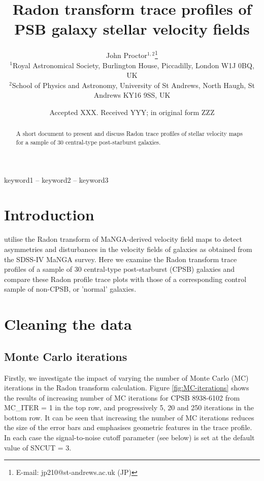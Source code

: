 \documentclass[fleqn,usenatbib]{mnras}
\title[Radon trace profiles of PSB galaxies]{Radon transform trace profiles of PSB galaxy stellar velocity fields}
\author[John Proctor]{
John Proctor$^{1,2}$\thanks{E-mail: jp210@st-andrews.ac.uk (JP)}
\\
$^{1}$Royal Astronomical Society, Burlington House, Piccadilly, London W1J 0BQ, UK\\
$^{2}$School of Physics and Astronomy, University of St Andrews, North Haugh, St Andrews KY16 9SS, UK\\
}
\date{Accepted XXX. Received YYY; in original form ZZZ}
\begin{document}
\label{firstpage}
\pagerange{\pageref{firstpage}--\pageref{lastpage}}
\maketitle

\begin{abstract}
A short document to present and discuss Radon trace profiles of stellar velocity maps for a sample of 30 central-type post-starburst galaxies. 
\end{abstract}

\begin{keywords}
keyword1 -- keyword2 -- keyword3
\end{keywords}


\section{Introduction}
\label{sec:Introduction}

\citet{2018MNRAS.480.2217S} utilise the Radon transform of MaNGA-derived velocity field maps to detect asymmetries and disturbances in the velocity fields of galaxies as obtained from the SDSS-IV MaNGA survey. Here we examine the Radon transform trace profiles of a sample of 30 central-type post-starburst (CPSB) galaxies and compare these Radon profile trace plots with those of a corresponding control sample of non-CPSB, or 'normal' galaxies.

\section{Cleaning the data}
\label{sec:cleaning}

\subsection{Monte Carlo iterations}
\label{MC-iter}
Firstly, we investigate the impact of varying the number of Monte Carlo (MC) iterations in the Radon transform calculation. Figure \ref{fig:MC-iterations} shows the results of increasing number of MC iterations for CPSB 8938-6102 from MC\_ITER = 1 in the top row, and progressively 5, 20 and 250 iterations in the bottom row. It can be seen that increasing the number of MC iterations reduces the size of the error bars and emphasises geometric features in the trace profile. In each case the signal-to-noise cutoff parameter (see below) is set at the default value of SNCUT = 3.
\end{document}

